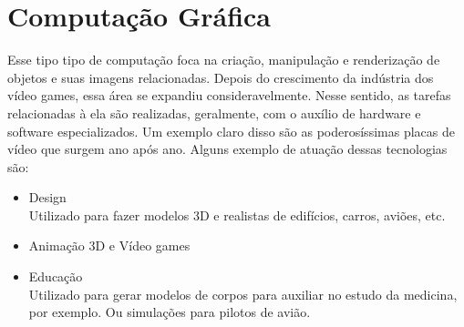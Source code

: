 \documentclass[a4paper, 12pt]{article}
\begin{document}
\section{Computação Gráfica}
Esse tipo tipo de computação foca na criação, manipulação e renderização de objetos e suas imagens relacionadas. Depois do crescimento da 
indústria dos vídeo games, essa área se expandiu consideravelmente. Nesse sentido, as tarefas relacionadas à ela são realizadas, geralmente, com 
o auxílio de hardware e software especializados. Um exemplo claro disso são as poderosíssimas placas de vídeo que surgem ano após ano.
Alguns exemplo de atuação dessas tecnologias são:
\begin{itemize}
	\item Design
 	\\ Utilizado para fazer modelos 3D e realistas de edifícios, carros, aviões, etc.
 	\item Animação 3D e Vídeo games
 	\item Educação
 	\\
 Utilizado para gerar modelos de corpos para auxiliar no estudo da medicina, por exemplo. Ou simulações para pilotos de avião.
\end{itemize}
\end{document}
